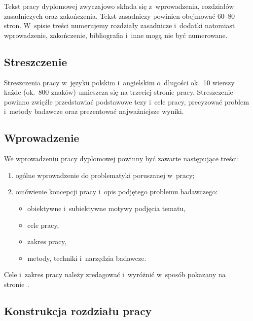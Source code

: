 \documentclass[skorowidz,skroty]{dyplomWEZUT}
\begin{document}
Tekst pracy dyplomowej zwyczajowo składa się z~wprowadzenia, rozdziałów zasadniczych oraz zakończenia. Tekst zasadniczy powinien obejmować 60--80 stron. W~spisie treści numerujemy rozdziały zasadnicze i~dodatki natomiast wprowadzenie, zakończenie, bibliografia i~inne mogą nie być numerowane.

\subsection{Streszczenie}\label{subsec:streszczenie}

Streszczenia pracy w~języku polskim i~angielskim o~długości ok.~10 wierszy każde (ok.~800 znaków) umieszcza się na trzeciej stronie pracy. Streszczenie powinno zwięźle przedstawiać podstawowe tezy i~cele pracy, precyzować problem i~metody badawcze oraz prezentować najważniejsze wyniki.

\subsection{Wprowadzenie}\label{subsec:wprowadzenie}

We wprowadzeniu pracy dyplomowej powinny być zawarte następujące treści:

\begin{enumerate}
    \item ogólne wprowadzenie do problematyki poruszanej w~pracy;
    \item omówienie koncepcji pracy i~opis podjętego problemu badawczego:
        \begin{itemize}
            \item obiektywne i~subiektywne motywy podjęcia tematu,
            \item cele pracy,
            \item zakres pracy,
            \item metody, techniki i~narzędzia badawcze.
        \end{itemize}
\end{enumerate}

\noindent Cele i~zakres pracy należy zredagować i~wyróżnić w~sposób pokazany na
stronie~\pageref{cel}.

\subsection{Konstrukcja rozdziału pracy}\label{subsec:konstrukcja}
\end{document}
